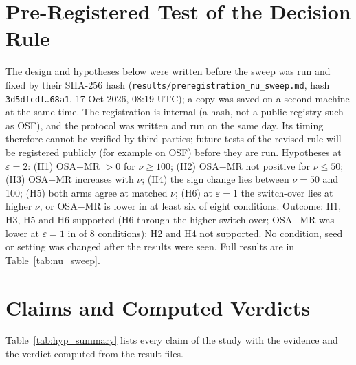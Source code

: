 \documentclass[journal]{IEEEtran}
\begin{document}
\section{Pre-Registered Test of the Decision Rule}
\label{sec:prereg}

The design and hypotheses below were written before the sweep was run and fixed by their SHA-256 hash (\texttt{results/preregistration\_nu\_sweep.md}, hash \texttt{3d5dfcdf\ldots68a1}, 17 Oct 2026, 08:19 UTC); a copy was saved on a second machine at the same time. The registration is internal (a hash, not a public registry such as OSF), and the protocol was written and run on the same day. Its timing therefore cannot be verified by third parties; future tests of the revised rule will be registered publicly (for example on OSF) before they are run. Hypotheses at $\varepsilon=2$: (H1) OSA$-$MR $>0$ for $\nu\ge100$; (H2) OSA$-$MR not positive for $\nu\le50$; (H3) OSA$-$MR increases with $\nu$; (H4) the sign change lies between $\nu=50$ and 100; (H5) both arms agree at matched $\nu$; (H6) at $\varepsilon=1$ the switch-over lies at higher $\nu$, or OSA$-$MR is lower in at least six of eight conditions. Outcome: H1, H3, H5 and H6 supported (H6 through the higher switch-over; OSA$-$MR was lower at $\varepsilon=1$ in \nsLowerCount{} of 8 conditions); H2 and H4 not supported. No condition, seed or setting was changed after the results were seen. Full results are in Table~\ref{tab:nu_sweep}.



\section{Claims and Computed Verdicts}
Table~\ref{tab:hyp_summary} lists every claim of the study with the evidence and the verdict computed from the result files.




\end{document}
